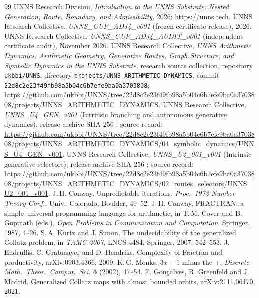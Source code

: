 \documentclass[11pt,a4paper]{article}
\theoremstyle{definition}
\begin{document}
\begin{thebibliography}{99}\small
{} UNNS Research Division, \emph{Introduction to the UNNS Substrate: Nested Generation, Route, Boundary, and Admissibility}, 2026; \url{https://unns.tech}.
 UNNS Research Collective, \emph{UNNS\_GUP\_ADJ4\_v001} (frozen certificate release), 2026.
 UNNS Research Collective, \emph{UNNS\_GUP\_ADJ4\_AUDIT\_v001} (independent certificate audit), November 2026.
 UNNS Research Collective, \emph{UNNS Arithmetic Dynamics: Arithmetic Geometry, Generative Routes, Graph Structure, and Symbolic Dynamics in the UNNS Substrate}, research source collection, repository \texttt{ukbbi/UNNS}, directory \texttt{projects/UNNS\_ARITHMETIC\_DYNAMICS}, commit \texttt{22d8c2e23f49fb98a5b04c6b7efe9ba0a3703808}; \url{https://github.com/ukbbi/UNNS/tree/22d8c2e23f49fb98a5b04c6b7efe9ba0a3703808/projects/UNNS_ARITHMETIC_DYNAMICS}.
 UNNS Research Collective, \emph{UNNS\_U4\_GEN\_v001} (Intrinsic branching and autonomous generative dynamics), release archive SHA-256 \texttt{}; source record: \url{https://github.com/ukbbi/UNNS/tree/22d8c2e23f49fb98a5b04c6b7efe9ba0a3703808/projects/UNNS_ARITHMETIC_DYNAMICS/04_symbolic_dynamics/UNNS_U4_GEN_v001}.
 UNNS Research Collective, \emph{UNNS\_U2\_001\_v001} (Intrinsic generative selectors), release archive SHA-256 \texttt{}; source record: \url{https://github.com/ukbbi/UNNS/tree/22d8c2e23f49fb98a5b04c6b7efe9ba0a3703808/projects/UNNS_ARITHMETIC_DYNAMICS/02_routes_selectors/UNNS_U2_001_v001}.
 J.\,H. Conway, Unpredictable iterations, \emph{Proc.\ 1972 Number Theory Conf.}, Univ.\ Colorado, Boulder, 49--52.
 J.\,H. Conway, FRACTRAN: a simple universal programming language for arithmetic, in T.\,M. Cover and B. Gopinath (eds.), \emph{Open Problems in Communication and Computation}, Springer, 1987, 4--26.
 S.\,A. Kurtz and J. Simon, The undecidability of the generalized Collatz problem, in \emph{TAMC 2007}, LNCS 4484, Springer, 2007, 542--553.
 J. Endrullis, C. Grabmayer and D. Hendriks, Complexity of Fractran and productivity, arXiv:0903.4366, 2009.
 K.\,G. Monks, $3x+1$ minus the $+$, \emph{Discrete Math.\ Theor.\ Comput.\ Sci.} \textbf{5} (2002), 47--54.
 F. Gon\c{c}alves, R. Greenfeld and J. Madrid, Generalized Collatz maps with almost bounded orbits, arXiv:2111.06170, 2021.

\end{thebibliography}
\end{document}

